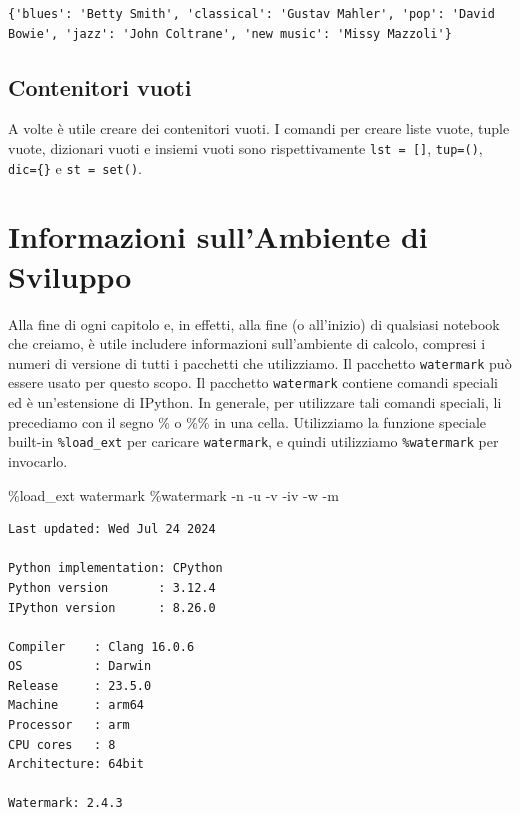 \documentclass[
  letterpaper,
  krantz2]{{[}./krantz{]}}
\newenvironment{Shaded}{\begin{snugshade}}{\end{snugshade}}
\newcommand{\NormalTok}[1]{\textcolor[rgb]{0.00,0.23,0.31}{#1}}
\newcommand{\OperatorTok}[1]{\textcolor[rgb]{0.37,0.37,0.37}{#1}}
\begin{document}
\begin{verbatim}
{'blues': 'Betty Smith', 'classical': 'Gustav Mahler', 'pop': 'David Bowie', 'jazz': 'John Coltrane', 'new music': 'Missy Mazzoli'}
\end{verbatim}

\subsection{Contenitori vuoti}\label{contenitori-vuoti}

A volte è utile creare dei contenitori vuoti. I comandi per creare liste
vuote, tuple vuote, dizionari vuoti e insiemi vuoti sono rispettivamente
\texttt{lst\ =\ {[}{]}}, \texttt{tup=()}, \texttt{dic=\{\}} e
\texttt{st\ =\ set()}.

\section{Informazioni sull'Ambiente di
Sviluppo}\label{informazioni-sullambiente-di-sviluppo}

Alla fine di ogni capitolo e, in effetti, alla fine (o all'inizio) di
qualsiasi notebook che creiamo, è utile includere informazioni
sull'ambiente di calcolo, compresi i numeri di versione di tutti i
pacchetti che utilizziamo. Il pacchetto \texttt{watermark} può essere
usato per questo scopo. Il pacchetto \texttt{watermark} contiene comandi
speciali ed è un'estensione di IPython. In generale, per utilizzare tali
comandi speciali, li precediamo con il segno \% o \%\% in una cella.
Utilizziamo la funzione speciale built-in \texttt{\%load\_ext} per
caricare \texttt{watermark}, e quindi utilizziamo \texttt{\%watermark}
per invocarlo.

\begin{Shaded}
\begin{Highlighting}[]
\OperatorTok{\%}\NormalTok{load\_ext watermark}
\OperatorTok{\%}\NormalTok{watermark }\OperatorTok{{-}}\NormalTok{n }\OperatorTok{{-}}\NormalTok{u }\OperatorTok{{-}}\NormalTok{v }\OperatorTok{{-}}\NormalTok{iv }\OperatorTok{{-}}\NormalTok{w }\OperatorTok{{-}}\NormalTok{m }
\end{Highlighting}
\end{Shaded}

\begin{verbatim}
Last updated: Wed Jul 24 2024

Python implementation: CPython
Python version       : 3.12.4
IPython version      : 8.26.0

Compiler    : Clang 16.0.6 
OS          : Darwin
Release     : 23.5.0
Machine     : arm64
Processor   : arm
CPU cores   : 8
Architecture: 64bit

Watermark: 2.4.3
\end{verbatim}
\end{document}
